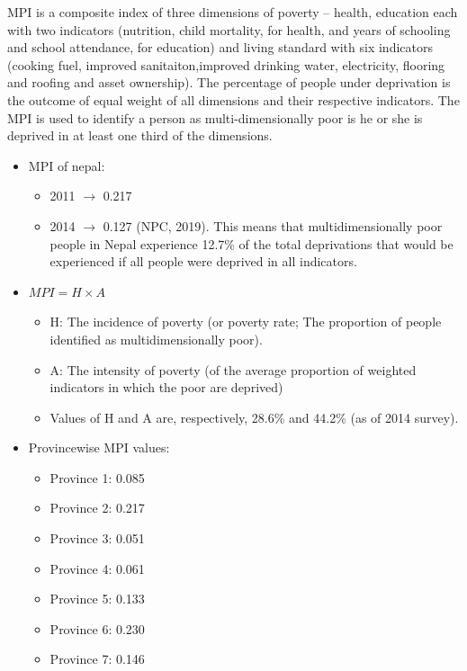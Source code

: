 \documentclass[
  openany]{book}
\providecommand{\tightlist}{%
  \setlength{\itemsep}{0pt}\setlength{\parskip}{0pt}}
\begin{document}
MPI is a composite index of three dimensions of poverty -- health, education each with two indicators (nutrition, child mortality, for health, and years of schooling and school attendance, for education) and living standard with six indicators (cooking fuel, improved sanitaiton,improved drinking water, electricity, flooring and roofing and asset ownership). The percentage of people under deprivation is the outcome of equal weight of all dimensions and their respective indicators. The MPI is used to identify a person as multi-dimensionally poor is he or she is deprived in at least one third of the dimensions.

\begin{itemize}
\tightlist
\item
  MPI of nepal:

  \begin{itemize}
  \tightlist
  \item
    2011 \(\longrightarrow\) 0.217
  \item
    2014 \(\longrightarrow\) 0.127 (NPC, 2019). This means that multidimensionally poor people in Nepal experience 12.7\% of the total deprivations that would be experienced if all people were deprived in all indicators.
  \end{itemize}
\item
  \(MPI = H \times A\)

  \begin{itemize}
  \tightlist
  \item
    H: The incidence of poverty (or poverty rate; The proportion of people identified as multidimensionally poor).
  \item
    A: The intensity of poverty (of the average proportion of weighted indicators in which the poor are deprived)
  \item
    Values of H and A are, respectively, 28.6\% and 44.2\% (as of 2014 survey).
  \end{itemize}
\item
  Provincewise MPI values:

  \begin{itemize}
  \tightlist
  \item
    Province 1: 0.085
  \item
    Province 2: 0.217
  \item
    Province 3: 0.051
  \item
    Province 4: 0.061
  \item
    Province 5: 0.133
  \item
    Province 6: 0.230
  \item
    Province 7: 0.146
  \end{itemize}
\end{itemize}
\end{document}
